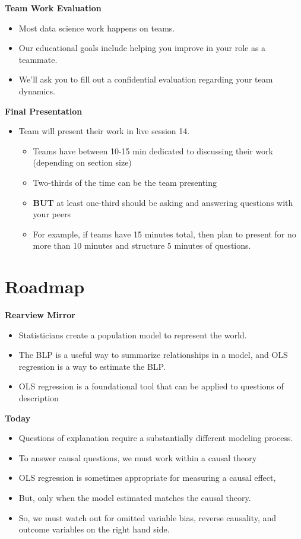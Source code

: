 \documentclass[
]{book}
\providecommand{\tightlist}{%
  \setlength{\itemsep}{0pt}\setlength{\parskip}{0pt}}
\theoremstyle{definition}
\theoremstyle{definition}
\theoremstyle{definition}
\theoremstyle{definition}
\theoremstyle{remark}
\begin{document}
\textbf{Team Work Evaluation}

\begin{itemize}
\tightlist
\item
  Most data science work happens on teams.
\item
  Our educational goals include helping you improve in your role as a teammate.
\item
  We'll ask you to fill out a confidential evaluation regarding your team dynamics.
\end{itemize}

\textbf{Final Presentation}

\begin{itemize}
\tightlist
\item
  Team will present their work in live session 14.

  \begin{itemize}
  \tightlist
  \item
    Teams have between 10-15 min dedicated to discussing their work (depending on section size)
  \item
    Two-thirds of the time can be the team presenting
  \item
    \textbf{BUT} at least one-third should be asking and answering questions with your peers
  \item
    For example, if teams have 15 minutes total, then plan to present for no more than 10 minutes and structure 5 minutes of questions.
  \end{itemize}
\end{itemize}

\hypertarget{roadmap-7}{%
\section{Roadmap}\label{roadmap-7}}

\textbf{Rearview Mirror}

\begin{itemize}
\tightlist
\item
  Statisticians create a population model to represent the world.
\item
  The BLP is a useful way to summarize relationships in a model, and OLS regression is a way to estimate the BLP.
\item
  OLS regression is a foundational tool that can be applied to questions of description
\end{itemize}

\textbf{Today}

\begin{itemize}
\tightlist
\item
  Questions of explanation require a substantially different modeling process.
\item
  To answer causal questions, we must work within a causal theory
\item
  OLS regression is sometimes appropriate for measuring a causal effect,
\item
  But, only when the model estimated matches the causal theory.
\item
  So, we must watch out for omitted variable bias, reverse causality, and outcome variables on the right hand side.
\end{itemize}
\end{document}
